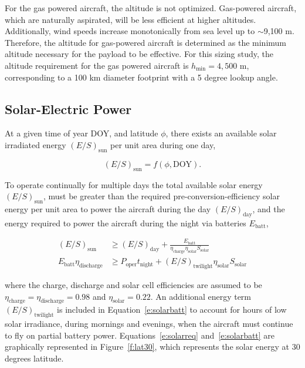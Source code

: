 For the gas powered aircraft, the altitude is not optimized.  
Gas-powered aircraft, which are naturally aspirated, will be less efficient at higher altitudes.  
Additionally, wind speeds increase monotonically from sea level up to $\sim$9,100 m.  
Therefore, the altitude for gas-powered aircraft is determined as the minimum altitude necessary for the payload to be effective.\cite{orion}
For this sizing study, the altitude requirement for the gas powered aircraft is $h_{\text{min}}=4,500$ m, corresponding to a 100 km diameter footprint with a 5 degree lookup angle. 

\subsection{Solar-Electric Power}

At a given time of year DOY, and latitude $\phi$, there exists an available solar irradiated energy $(E/S)_{\text{sun}}$ per unit area during one day,

\begin{equation}
    \label{e:solarfunc}
    (E/S)_{\text{sun}} = f(\phi, \text{DOY}).
\end{equation}

To operate continually for multiple days the total available solar energy $(E/S)_{\text{sun}}$, must be greater than the required pre-conversion-efficiency solar energy per unit area to power the aircraft during the day $(E/S)_{\text{day}}$, and the energy required to power the aircraft during the night via batteries $E_{\text{batt}}$,\cite{solartech}

\begin{align}
    \label{e:solarreq}
    (E/S)_{\text{sun}}  &\geq (E/S)_{\text{day}} + \frac{E_{\text{batt}}}{\eta_{\text{charge}}\eta_{\text{solar}} S_{\text{solar}}} \\
    \label{e:solarbatt}
    E_{\text{batt}} \eta_{\text{discharge}} &\geq P_{\text{oper}}t_{\text{night}} + (E/S)_{\text{twilight}} \eta_{\text{solar}} S_{\text{solar}}
\end{align}

where the charge, discharge and solar cell efficiencies are assumed to be $\eta_{\text{charge}} = \eta_{\text{discharge}} = 0.98$ and $\eta_{\text{solar}}= 0.22$. 
An additional energy term $(E/S)_{\text{twilight}}$ is included in Equation~\eqref{e:solarbatt} to account for hours of low solar irradiance, during mornings and evenings, when the aircraft must continue to fly on partial battery power. 
Equations~\eqref{e:solarreq} and~\eqref{e:solarbatt} are graphically represented in Figure~\ref{f:lat30}, which represents the solar energy at 30 degrees latitude. 

